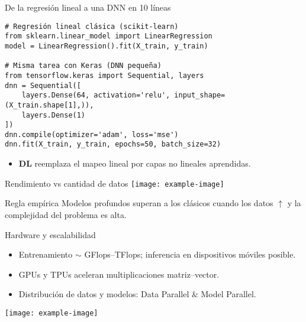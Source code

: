 \documentclass[12pt,spanish]{beamer}
\begin{document}
\begin{frame}[fragile]{De la regresión lineal a una DNN en 10 líneas}
  \begin{verbatim}
# Regresión lineal clásica (scikit-learn)
from sklearn.linear_model import LinearRegression
model = LinearRegression().fit(X_train, y_train)

# Misma tarea con Keras (DNN pequeña)
from tensorflow.keras import Sequential, layers
dnn = Sequential([
    layers.Dense(64, activation='relu', input_shape=(X_train.shape[1],)),
    layers.Dense(1)
])
dnn.compile(optimizer='adam', loss='mse')
dnn.fit(X_train, y_train, epochs=50, batch_size=32)
  \end{verbatim}
  \vspace{-1em}
  \begin{itemize}
    \item \textbf{DL} reemplaza el mapeo lineal por capas no lineales aprendidas.
  \end{itemize}
\end{frame}

\begin{frame}{Rendimiento vs cantidad de datos}
  \centering
  \texttt{[image: example-image]}
  \begin{block}{Regla empírica}
    Modelos profundos superan a los clásicos cuando los datos \(\uparrow\)
    y la complejidad del problema es alta.
  \end{block}
\end{frame}

\begin{frame}{Hardware y escalabilidad}
  \begin{itemize}
    \item Entrenamiento \(\sim\) GFlops–TFlops; inferencia en dispositivos móviles posible.
    \item GPUs y TPUs aceleran multiplicaciones matriz–vector.
    \item Distribución de datos y modelos: Data Parallel \& Model Parallel.
  \end{itemize}
  \texttt{[image: example-image]}
\end{frame}
\end{document}
